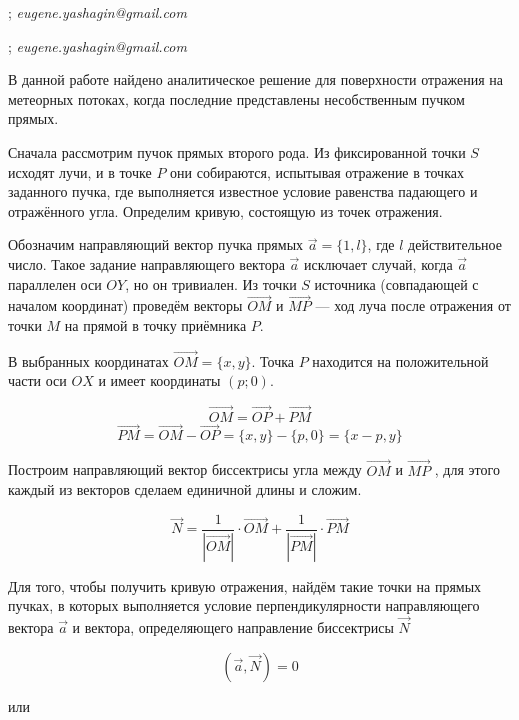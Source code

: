 

; {\it eugene.yashagin@gmail.com}


; {\it eugene.yashagin@gmail.com}

\vzmscaption


В данной работе найдено аналитическое решение для поверхности отражения на метеорных потоках, когда последние представлены несобственным пучком прямых.

Сначала рассмотрим пучок прямых второго рода. Из фиксированной точки $S$ исходят лучи, и в точке $P$ они собираются, испытывая отражение в точках заданного пучка, где выполняется известное условие равенства падающего и отражённого угла. Определим кривую, состоящую из точек отражения.

Обозначим направляющий вектор пучка прямых $\vec a = \{ 1,l \}$, где $l$ действительное число. Такое задание направляющего вектора $\vec a $ исключает случай, когда $\vec a $ параллелен оси $ OY$, но он тривиален. Из точки $S$ источника (совпадающей с началом координат) проведём векторы $\overrightarrow{OM}$ и $\overrightarrow{MP}$ --- ход луча после отражения от точки $M$ на прямой в точку приёмника $P$.

В выбранных координатах $\overrightarrow{OM}=\{x,y\}$. Точка $P$ находится на положительной части оси $OX$ и имеет координаты $(p;0)$.


$$\overrightarrow{OM}=\overrightarrow{OP}+\overrightarrow{PM}$$
$$\overrightarrow{PM}=\overrightarrow{OM}-\overrightarrow{OP}=\{x,y\}-\{p,0\}=\{x-p,y\}$$

Построим направляющий вектор биссектрисы   угла между $\overrightarrow{OM}$ и $\overrightarrow{MP}$ , для этого каждый из векторов сделаем единичной длины и сложим.


$$ \vec{N}=\frac{1}{|\overrightarrow{OM}|}\cdot\overrightarrow{OM}+\frac{1}{|\overrightarrow{PM}|}\cdot\overrightarrow{PM} $$



Для того, чтобы получить кривую отражения, найдём такие точки на прямых пучках,
в которых выполняется условие перпендикулярности направляющего вектора $\vec a$ и  вектора,
определяющего направление биссектрисы $\vec N$

$$(\vec a,\vec N )=0$$

или

